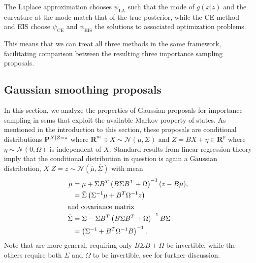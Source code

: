 The Laplace approximation chooses $\psi_{\text{LA}}$ such that the mode of $g(x|z)$ and the curvature at the mode match that of the true posterior, while the CE-method and EIS choose $\psi_{\text{CE}}$ and $\psi_{\text{EIS}}$ the solutions to associated optimization problems.

This means that we can treat all three methods in the same framework, facilitating comparison between the resulting three importance sampling proposals.


\subsection{Gaussian smoothing proposals}
\label{subsec:gaussian_smoothing_proposals}
In this section, we analyze the properties of Gaussian proposals for importance sampling in \glspl{ssm} that exploit the available Markov property of states. As mentioned in the introduction to this section, these proposals are conditional distributions $\P^{X|Z=z}$ where $ \mathbf{R}^{m} \ni X \sim \mathcal N \left( \mu, \Sigma \right)$ and $Z = BX + \eta \in \mathbf{R}^{p}$ where $\eta\sim\mathcal N(0, \Omega)$ is independent of $X$. Standard results from linear regression theory imply that the conditional distribution in question is again a Gaussian distribution, $X|Z=z \sim \mathcal N(\bar \mu, \bar \Sigma)$ with mean
\begin{align}
    \bar \mu    & = \mu + \Sigma B^{T} \left( B \Sigma B^{T} + \Omega \right)^{-1} (z - B \mu), \label{eq:posterior_mean_1} \\
                & = \bar \Sigma\left(\Sigma^{-1}\mu + B^{T}\Omega^{-1}z \right)\label{eq:posterior_mean_2}                  \\
    \intertext{and covariance matrix}
    \bar \Sigma & = \Sigma - \Sigma B^T \left( B\Sigma B^{T} + \Omega \right) ^{-1} B \Sigma \label{eq:posterior_cov_1}     \\
                & = \left(\Sigma^{-1} + B^{T}\Omega^{-1}B\right)^{-1} \label{eq:posterior_cov_2}.
\end{align}
Note that  are more general, requiring only $B \Sigma B + \Omega$ be invertible, while the others require both $\Sigma$ and $\Omega$ to be invertible, see \cite[Lemma 7.1]{Chopin2020Introduction} for further discussion.

